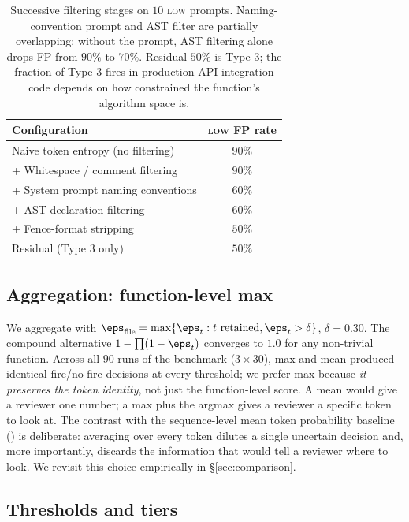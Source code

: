 \begin{table}[h]
\centering
\small
\begin{tabular}{lc}
\toprule
\textbf{Configuration} & \textbf{\textsc{low} FP rate} \\
\midrule
Naive token entropy (no filtering)                & $90\%$ \\
+ Whitespace / comment filtering                   & $90\%$ \\
+ System prompt naming conventions                 & $60\%$ \\
+ AST declaration filtering                        & $60\%$ \\
+ Fence-format stripping                           & $50\%$ \\
\midrule
Residual (Type 3 only)                             & $50\%$ \\
\bottomrule
\end{tabular}
\caption{Successive filtering stages on $10$ \textsc{low} prompts.
Naming-convention prompt and AST filter are partially overlapping;
without the prompt, AST filtering alone drops FP from $90\%$ to
$70\%$. Residual $50\%$ is Type 3; the fraction of Type 3 fires
in production API-integration code depends on how constrained
the function's algorithm space is.}
\label{tab:filtering}
\end{table}

\subsection{Aggregation: function-level max}
\label{subsec:aggregation}

We aggregate with
$\eps_\text{file} = \max\{\eps_t : t \text{ retained}, \eps_t >
\delta\}$, $\delta = 0.30$. The compound alternative $1 - \prod(1 -
\eps_t)$ converges to $1.0$ for any non-trivial function. Across all
$90$ runs of the benchmark ($3 \times 30$), max and mean produced
identical fire/no-fire decisions at every threshold; we prefer max
because \emph{it preserves the token identity}, not just the
function-level score. A mean would give a reviewer one number; a
max plus the argmax gives a reviewer a specific token to look at.
The contrast with the sequence-level mean token probability baseline
(\papg) is deliberate: averaging over every token dilutes a single
uncertain decision and, more importantly, discards the information
that would tell a reviewer where to look. We revisit this choice
empirically in \S\ref{sec:comparison}.

\subsection{Thresholds and tiers}
\label{subsec:tiers}

